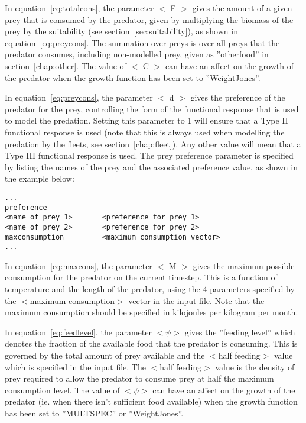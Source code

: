 \documentclass[10pt,twoside]{book}
\begin{document}
\bigskip
In equation~\ref{eq:totalcons}, the parameter $<$ F $>$ gives the amount of a given prey that is consumed by the predator, given by multiplying the biomass of the prey by the suitability (see section~\ref{sec:suitability}), as shown in equation~\ref{eq:preycons}.  The summation over preys is over all preys that the predator consumes, including non-modelled prey, given as ''otherfood'' in section~\ref{chap:other}.  The value of $<$ C $>$ can have an affect on the growth of the predator when the growth function has been set to ''WeightJones''.

\bigskip
In equation~\ref{eq:preycons}, the parameter $<$ d $>$ gives the preference of the predator for the prey, controlling the form of the functional response that is used to model the predation.  Setting this parameter to 1 will ensure that a Type II functional response is used (note that this is always used when modelling the predation by the fleets, see section~\ref{chap:fleet}).  Any other value will mean that a Type III functional response is used.  The prey preference parameter is specified by listing the names of the prey and the associated preference value, as shown in the example below:

{\small\begin{verbatim}
...
preference
<name of prey 1>       <preference for prey 1>
<name of prey 2>       <preference for prey 2>
maxconsumption         <maximum consumption vector>
...
\end{verbatim}}

In equation~\ref{eq:maxcons}, the parameter $<$ M $>$ gives the maximum possible consumption for the predator on the current timestep.  This is a function of temperature and the length of the predator, using the 4 parameters specified by the $<$maximum consumption$>$ vector in the input file.  Note that the maximum consumption should be specified in kilojoules per kilogram per month.

\bigskip
In equation~\ref{eq:feedlevel}, the parameter $<\psi>$ gives the ''feeding level'' which denotes the fraction of the available food that the predator is consuming.  This is governed by the total amount of prey available and the $<$half feeding$>$ value which is specified in the input file.  The $<$half feeding$>$ value is the density of prey required to allow the predator to consume prey at half the maximum consumption level.  The value of $<\psi>$ can have an affect on the growth of the predator (ie. when there isn't sufficient food available) when the growth function has been set to ''MULTSPEC'' or ''WeightJones''.
\end{document}
